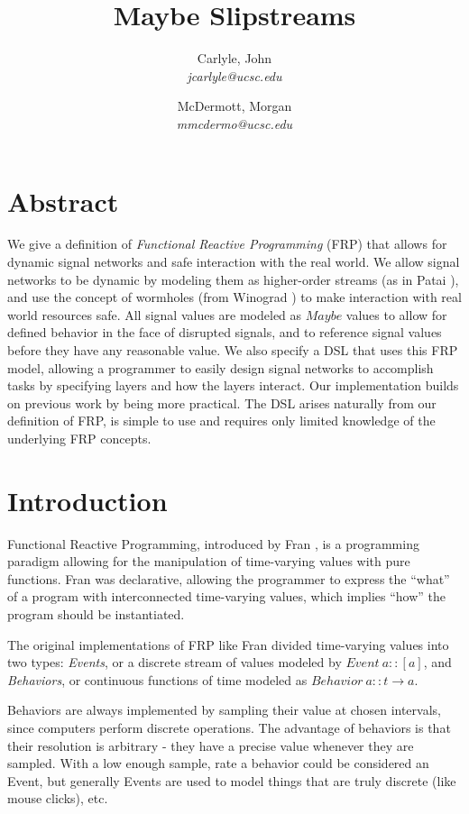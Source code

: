 \documentclass[twocolumn,11pt,english]{article}
\title{Maybe Slipstreams}
\date{}
\author{
  Carlyle, John\\
  \textit{jcarlyle@ucsc.edu}
  \and
  McDermott, Morgan\\
  \textit{mmcdermo@ucsc.edu}
}
\begin{document}
\maketitle

\section*{Abstract}
We give a definition of \textit{Functional Reactive Programming} (FRP) that allows for dynamic signal networks and safe interaction with the real world. We allow signal networks to be dynamic by modeling them as higher-order streams (as in Patai \cite{HighOrderStreams}), and use the concept of wormholes (from Winograd \cite{WinogradCort2012HS}) to make interaction with real world resources safe. All signal values are modeled as $Maybe$ values to allow for defined behavior in the face of disrupted signals, and to reference signal values before they have any reasonable value. We also specify a DSL that uses this FRP model, allowing a programmer to easily design signal networks to accomplish tasks by specifying layers and how the layers interact. Our implementation builds on previous work by being more practical. The DSL arises naturally from our definition of FRP, is simple to use and requires only limited knowledge of the underlying FRP concepts.

\section{Introduction}
  
Functional Reactive Programming, introduced by Fran \cite{ElliottHudak97:Fran}, is a programming paradigm allowing for the manipulation of time-varying values with pure functions. Fran was declarative, allowing the programmer to express the ``what'' of a program with interconnected time-varying values, which implies ``how'' the program should be instantiated. 

The original implementations of FRP like Fran divided time-varying values into two types: \textit{Events}, or a discrete stream of values modeled by $Event~a:: [a]$, and \textit{Behaviors}, or continuous functions of time modeled as $Behavior~a :: t \rightarrow a$. 

Behaviors are always implemented by sampling their value at chosen intervals, since computers perform discrete operations. The advantage of behaviors is that their resolution is arbitrary - they have a precise value whenever they are sampled. With a low enough sample, rate a behavior could be considered an Event, but generally Events are used to model things that are truly discrete (like mouse clicks), etc. 
\end{document}
